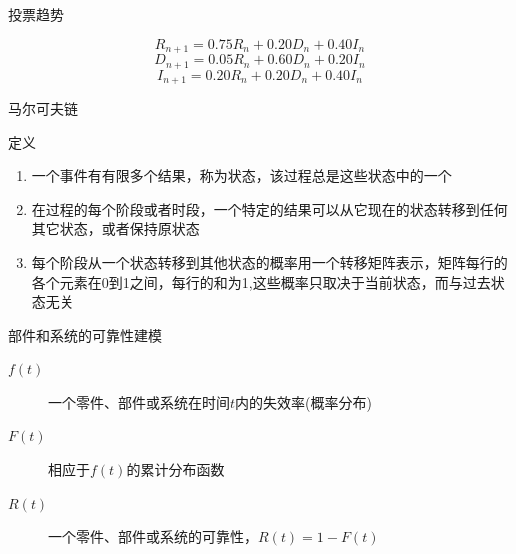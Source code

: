 \documentclass[mathserif, table]{beamer}
\begin{document}
\begin{frame}{投票趋势}
  \begin{figure}
    \centering
    \setcounter{subfigure}{0}{}
  \end{figure}
  \[
  R_{n+1}=0.75R_n+0.20D_n+0.40I_n
  \]
  \[
  D_{n+1}=0.05R_n+0.60D_n+0.20I_n
  \]
  \[
  I_{n+1}=0.20R_n+0.20D_n+0.40I_n
  \]

\end{frame}

\begin{frame}{马尔可夫链}

  \begin{block}{定义}
    \begin{enumerate}
    \item 一个事件有有限多个结果，称为状态，该过程总是这些状态中的一个
    \item 在过程的每个阶段或者时段，一个特定的结果可以从它现在的状态转移到任何其它状态，或者保持原状态
    \item 每个阶段从一个状态转移到其他状态的概率用一个转移矩阵表示，矩阵每行的各个元素在0到1之间，每行的和为1,这些概率只取决于当前状态，而与过去状态无关
    \end{enumerate}
  \end{block}
  
\end{frame}

\begin{frame}{部件和系统的可靠性建模}

  \begin{description}
  \item[$f(t)$] 一个零件、部件或系统在时间$t$内的失效率(概率分布)
  \item[$F(t)$] 相应于$f(t)$的累计分布函数
  \item[$R(t)$] 一个零件、部件或系统的可靠性，$R(t)=1-F(t)$
  \end{description}
  
\end{frame}
\end{document}

